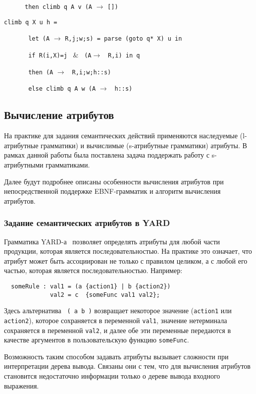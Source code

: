         
\ \ \ \ \ \  \verb|then climb q A v (A| $\rightarrow$ \verb|[])|
        
\verb|climb q X u h = |

  \ \ \ \ \ \ \verb| let (A| $\rightarrow$ \verb|R,j;w;s) = parse (goto q* X) u in|
  
  \ \ \ \ \ \ \verb| if R(i,X)=j| \ $\&$ \ \verb|(A|$\rightarrow$ \verb| R,i) in q| 
  
  \ \ \ \ \ \ \verb| then (A| $\rightarrow$ \verb| R,i;w;h::s)|
   
  \ \ \ \ \ \ \verb| else climb q A w (A| $\rightarrow$ \verb| h::s)|


\subsection{Вычисление атрибутов}

На практике для задания семантических действий применяются наследуемые (l-атрибутные грамматики) и вычислимые (s-атрибутные грамматики) атрибуты. В рамках данной работы была поставлена задача поддержать работу с s-атрибутными грамматиками.

Далее будут подробнее описаны особенности вычисления атрибутов при непосредственной поддержке EBNF-грамматик и алгоритм вычисления атрибутов.


\subsubsection{Задание семантических атрибутов в YARD}

Грамматика YARD-а~\cite{Diploma} позволяет определять атрибуты для любой части продукции, которая является последовательностью. На практике это означает, что атрибут может быть ассоциирован не только с правилом целиком, а с любой его частью, которая является последовательностью. Например:

\begin{verbatim}
  someRule : val1 = (a {action1} | b {action2}) 
             val2 = c  {someFunc val1 val2};
\end{verbatim}

Здесь альтернатива \verb| ( a |\verb|b )| возвращает некоторое значение (\verb|action1| или \verb|action2|), которое сохраняется в переменной \verb|val1|, значение нетерминала сохраняется в переменной \verb|val2|, и далее обе эти переменные передаются в качестве аргументов в пользовательскую функцию \verb|someFunc|.

Возможность таким способом задавать атрибуты вызывает сложности при интерпретации дерева вывода. Связаны они с тем, что для вычисления атрибутов становится недостаточно информации только о дереве вывода входного выражения. 

